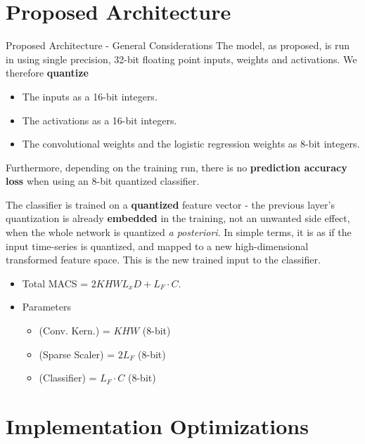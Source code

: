 \documentclass[10pt,aspectratio=169]{beamer}
\begin{document}
\section{Proposed Architecture}
\begin{frame}[fragile]{Proposed Architecture - General Considerations}
	The model, as proposed, is run in using single precision, 32-bit floating point inputs, weights and activations. We therefore \textbf{quantize}

	\begin{itemize}
		\item The inputs as a 16-bit integers.
		\item The activations as a 16-bit integers.
		\item The convolutional weights and the logistic regression weights as 8-bit integers.
	\end{itemize}

	\medskip

	Furthermore, depending on the training run, there is no \textbf{prediction accuracy loss} when using an 8-bit quantized classifier. 
	
	\medskip

	The classifier is trained on a \textbf{quantized} feature vector - the previous layer's quantization is already \textbf{embedded} in the training,
	not an unwanted side effect, when the whole network is quantized \textit{a posteriori}. In simple terms, it is as if the input time-series is quantized, and mapped to a new high-dimensional transformed feature space. This is the new trained input to the classifier.

\begin{itemize}
    \item Total MACS                 = $2KHWL_xD + L_F \cdot C$.
    \item Parameters 
        \begin{itemize}
            \item (Conv. Kern.)   = $KHW$ (8-bit)
            \item (Sparse Scaler) = $2L_F$ (8-bit)
            \item (Classifier)    = $L_F \cdot C$ (8-bit)
        \end{itemize}
\end{itemize}
\end{frame}

\section{Implementation Optimizations}
\end{document}
